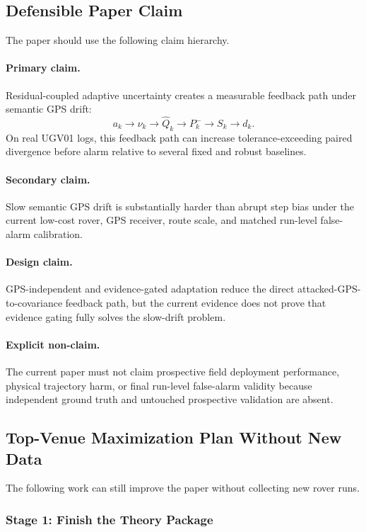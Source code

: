 \subsection{Defensible Paper Claim}

The paper should use the following claim hierarchy.

\paragraph{Primary claim.}
Residual-coupled adaptive uncertainty creates a measurable feedback path under
semantic GPS drift:
\[
    a_k \rightarrow \nu_k \rightarrow \widehat{Q}_k
    \rightarrow P_k^- \rightarrow S_k \rightarrow d_k.
\]
On real UGV01 logs, this feedback path can increase tolerance-exceeding paired
divergence before alarm relative to several fixed and robust baselines.

\paragraph{Secondary claim.}
Slow semantic GPS drift is substantially harder than abrupt step bias under
the current low-cost rover, GPS receiver, route scale, and matched run-level
false-alarm calibration.

\paragraph{Design claim.}
GPS-independent and evidence-gated adaptation reduce the direct
attacked-GPS-to-covariance feedback path, but the current evidence does not
prove that evidence gating fully solves the slow-drift problem.

\paragraph{Explicit non-claim.}
The current paper must not claim prospective field deployment performance,
physical trajectory harm, or final run-level false-alarm validity because
independent ground truth and untouched prospective validation are absent.

\subsection{Top-Venue Maximization Plan Without New Data}

The following work can still improve the paper without collecting new rover
runs.

\subsubsection{Stage 1: Finish the Theory Package}

